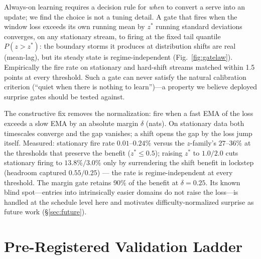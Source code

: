 \documentclass{article}
\begin{document}
Always-on learning requires a decision rule for \emph{when} to convert a
serve into an update; we find the choice is not a tuning detail.
A gate that fires when the window loss exceeds its own running mean by
$z^\ast$ running standard deviations converges, on any stationary stream, to
firing at the fixed tail quantile $P(z>z^\ast)$: the boundary storms it
produces at distribution shifts are real (mean-lag), but its steady state is
regime-independent (Fig.~\ref{fig:gatelaw}). Empirically the fire rate on
stationary and hard-shift streams matched within 1.5 points at every
threshold. Such a gate can never satisfy the natural calibration criterion
(``quiet when there is nothing to learn'')---a property we believe deployed
surprise gates should be tested against.

The constructive fix removes the normalization: fire when a fast EMA of the
loss exceeds a slow EMA by an absolute margin $\delta$ (nats). On stationary
data both timescales converge and the gap vanishes; a shift opens the gap by
the loss jump itself. Measured: stationary fire rate $0.01$--$0.24\%$
versus the $z$-family's $27$--$36\%$ at the thresholds that preserve the
benefit ($z^\ast\le0.5$); raising $z^\ast$ to $1.0/2.0$ cuts stationary
firing to $13.8\%/3.0\%$ only by surrendering the shift benefit in lockstep
(headroom captured $0.55/0.25$) --- the rate is regime-independent at every
threshold. The margin gate retains 90\% of the benefit at $\delta{=}0.25$. Its known blind spot---entries into
intrinsically easier domains do not raise the loss---is handled at the
schedule level here and motivates difficulty-normalized surprise as future
work (\S\ref{sec:future}).

\section{Pre-Registered Validation Ladder}
\label{sec:ladder}
\end{document}
